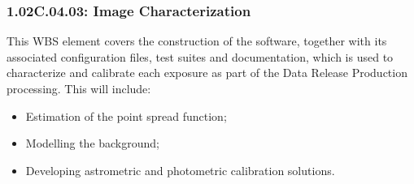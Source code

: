 \subsubsection{1.02C.04.03: Image Characterization}

This WBS element covers the construction of the software, together with
its associated configuration files, test suites and documentation, which
is used to characterize and calibrate each exposure as part of the Data
Release Production processing. This will include:

\begin{itemize}

\item{Estimation of the point spread function;}
\item{Modelling the background;}
\item{Developing astrometric and photometric calibration solutions.}

\end{itemize}
